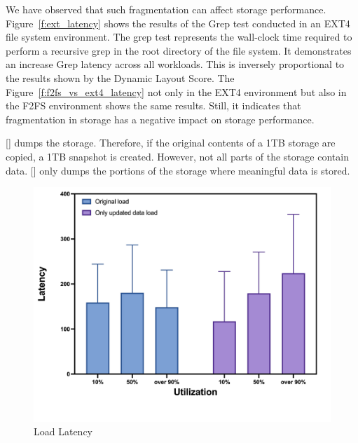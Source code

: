 We have observed that such fragmentation can affect storage performance.
Figure~\ref{f:ext_latency} shows the results of the Grep test conducted in an EXT4 file system environment.
The grep test represents the wall-clock time required to perform a recursive grep in the root directory of the file system.
It demonstrates an increase Grep latency across all workloads.
This is inversely proportional to the results shown by the Dynamic Layout Score.
The Figure~\ref{f:f2fs_vs_ext4_latency} not only in the EXT4 environment but also in the F2FS environment shows the same results.
Still, it indicates that fragmentation in storage has a negative impact on storage performance.

[] dumps the storage.
Therefore, if the original contents of a 1TB storage are copied, a 1TB snapshot is created.
However, not all parts of the storage contain data.
[] only dumps the portions of the storage where meaningful data is stored.

\begin{figure}[t]
    \centering
	\includegraphics[width=0.95\columnwidth]{graphs/load_latency}
	\caption{Load Latency}
	\label{f:load_latency}
\end{figure}

